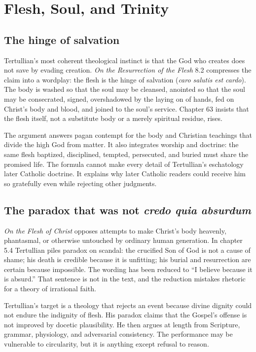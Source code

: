 \section{Flesh, Soul, and Trinity}

\subsection{The hinge of salvation}

Tertullian's most coherent theological instinct is that the God who creates does
not save by evading creation. \emph{On the Resurrection of the Flesh} 8.2
compresses the claim into a wordplay: the flesh is the hinge of salvation
(\emph{caro salutis est cardo}). The body is washed so that the soul may be
cleansed, anointed so that the soul may be consecrated, signed, overshadowed by
the laying on of hands, fed on Christ's body and blood, and joined to the soul's
service. Chapter 63 insists that the flesh itself, not a substitute body or a
merely spiritual residue, rises.

The argument answers pagan contempt for the body and Christian teachings that
divide the high God from matter. It also integrates worship and doctrine: the
same flesh baptized, disciplined, tempted, persecuted, and buried must share the
promised life. The formula cannot make every detail of Tertullian's eschatology
later Catholic doctrine. It explains why later Catholic readers could receive
him so gratefully even while rejecting other judgments.

\subsection{The paradox that was not \emph{credo quia absurdum}}

\emph{On the Flesh of Christ} opposes attempts to make Christ's body heavenly,
phantasmal, or otherwise untouched by ordinary human generation. In chapter
5.4 Tertullian piles paradox on scandal: the crucified Son of God is not a cause
of shame; his death is credible because it is unfitting; his burial and
resurrection are certain because impossible. The wording has been reduced to
``I believe because it is absurd.'' That sentence is not in the text, and the
reduction mistakes rhetoric for a theory of irrational faith.

Tertullian's target is a theology that rejects an event because divine dignity
could not endure the indignity of flesh. His paradox claims that the Gospel's
offense is not improved by docetic plausibility. He then argues at length from
Scripture, grammar, physiology, and adversarial consistency. The performance
may be vulnerable to circularity, but it is anything except refusal to reason.

